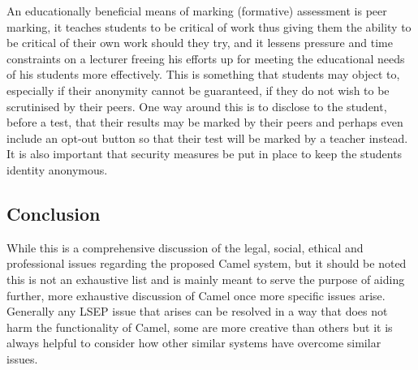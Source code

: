     An educationally beneficial means of marking (formative) assessment is peer marking, it teaches students to be critical of work thus giving them the ability to be critical of their own work should they try, and it lessens pressure and time constraints on a lecturer freeing his efforts up for meeting the educational needs of his students more effectively. This is something that students may object to, especially if their anonymity cannot be guaranteed, if they do not wish to be scrutinised by their peers. One way around this is to disclose to the student, before a test, that their results may be marked by their peers and perhaps even include an opt-out button so that their test will be marked by a teacher instead. It is also important that security measures be put in place to keep the students identity anonymous.

    \subsection*{Conclusion}
    While this is a comprehensive discussion of the legal, social, ethical and professional issues regarding the proposed Camel system, but it should be noted this is not an exhaustive list and is mainly meant to serve the purpose of aiding further, more exhaustive discussion of Camel once more specific issues arise. Generally any LSEP issue that arises can be resolved in a way that does not harm the functionality of Camel, some are more creative than others but it is always helpful to consider how other similar systems have overcome similar issues.
